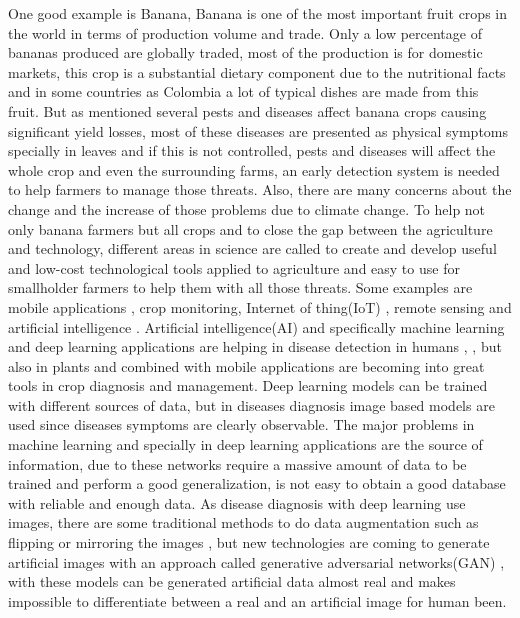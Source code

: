 One good example is Banana, Banana is one of the most important fruit crops in the world  in terms of production volume and trade\cite{faostat2014food}. Only a low percentage of bananas produced are globally traded\cite{lescot2013world}, most of the production is for domestic markets, this crop is a substantial dietary component \cite{abele2007bacterial} due to the nutritional facts and in some countries as Colombia a lot of typical dishes are made from this fruit.
But as mentioned several pests and diseases affect banana crops causing significant yield losses\cite{blomme2017bacterial}, most of these diseases are presented as physical symptoms specially in leaves and if this is not controlled, pests and diseases will affect the whole crop and even the surrounding farms, an early detection system is needed to help farmers to manage those threats. Also, there are many concerns about the change and the increase of those problems due to climate change\cite{garrett2013cambio}\cite{hamada2011impacts}. To help not only banana farmers but all crops and to close the gap between the agriculture and technology, different areas in science are called to create and develop useful and low-cost technological tools applied to agriculture and easy to use for smallholder farmers to help them with all those threats. Some examples are mobile applications \cite{qiang2012mobile} , crop monitoring\cite{berni2009thermal}\cite{hunt2010acquisition}, Internet of thing(IoT)\cite{baoyun2009review} , remote sensing\cite{doraiswamy2003crop} and artificial intelligence \cite{murase2000artificial}. 
Artificial intelligence(AI) and specifically machine learning and deep learning applications are helping in disease detection in humans 
\cite{esteva2017dermatologist}, \cite{rajpurkar2017chexnet} , \cite{shen2017deep}  but also in plants \cite{mohanty2016using} and combined with mobile applications are becoming into great tools in crop diagnosis and management\cite{ramcharan2017deep}. Deep learning models can be trained with different sources of data, but in diseases diagnosis image based\cite{mohanty2016using} models are used since diseases symptoms are clearly observable. The major problems in machine learning and specially in deep learning applications are the source of information, due to these networks require a massive amount of data to be trained and perform a good generalization, is not easy to obtain a good database with reliable and enough data. As disease diagnosis with deep learning use images, there are some traditional methods to do data augmentation such as flipping or mirroring the images \cite{bloice2017augmentor}, but new technologies are coming to generate artificial images with an approach called generative adversarial networks(GAN)\cite{NIPS2014_5423} \cite{perez2017effectiveness} , with these models can be generated artificial data almost real and makes impossible to differentiate between a real and an artificial image for human been\cite{karras2018style}.

